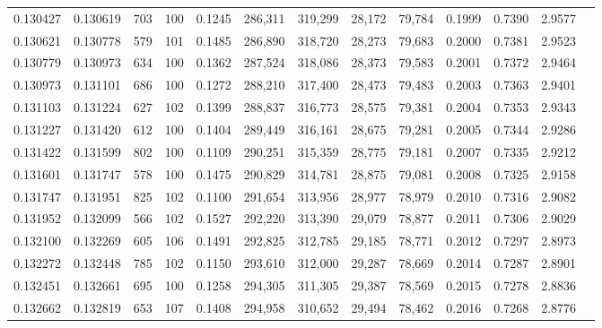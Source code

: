 \begin{tabular}{rrrrrrrrrrrrr}
0.130427 & 0.130619 &   703 & 100 &                                     0.1245 & 286,311 & 319,299 &  28,172 &  79,784 & 0.1999 & 0.7390 & 2.9577 \\
0.130621 & 0.130778 &   579 & 101 &                                     0.1485 & 286,890 & 318,720 &  28,273 &  79,683 & 0.2000 & 0.7381 & 2.9523 \\
0.130779 & 0.130973 &   634 & 100 &                                     0.1362 & 287,524 & 318,086 &  28,373 &  79,583 & 0.2001 & 0.7372 & 2.9464 \\
0.130973 & 0.131101 &   686 & 100 &                                     0.1272 & 288,210 & 317,400 &  28,473 &  79,483 & 0.2003 & 0.7363 & 2.9401 \\
0.131103 & 0.131224 &   627 & 102 &                                     0.1399 & 288,837 & 316,773 &  28,575 &  79,381 & 0.2004 & 0.7353 & 2.9343 \\
0.131227 & 0.131420 &   612 & 100 &                                     0.1404 & 289,449 & 316,161 &  28,675 &  79,281 & 0.2005 & 0.7344 & 2.9286 \\
0.131422 & 0.131599 &   802 & 100 &                                     0.1109 & 290,251 & 315,359 &  28,775 &  79,181 & 0.2007 & 0.7335 & 2.9212 \\
0.131601 & 0.131747 &   578 & 100 &                                     0.1475 & 290,829 & 314,781 &  28,875 &  79,081 & 0.2008 & 0.7325 & 2.9158 \\
0.131747 & 0.131951 &   825 & 102 &                                     0.1100 & 291,654 & 313,956 &  28,977 &  78,979 & 0.2010 & 0.7316 & 2.9082 \\
0.131952 & 0.132099 &   566 & 102 &                                     0.1527 & 292,220 & 313,390 &  29,079 &  78,877 & 0.2011 & 0.7306 & 2.9029 \\
0.132100 & 0.132269 &   605 & 106 &                                     0.1491 & 292,825 & 312,785 &  29,185 &  78,771 & 0.2012 & 0.7297 & 2.8973 \\
0.132272 & 0.132448 &   785 & 102 &                                     0.1150 & 293,610 & 312,000 &  29,287 &  78,669 & 0.2014 & 0.7287 & 2.8901 \\
0.132451 & 0.132661 &   695 & 100 &                                     0.1258 & 294,305 & 311,305 &  29,387 &  78,569 & 0.2015 & 0.7278 & 2.8836 \\
0.132662 & 0.132819 &   653 & 107 &                                     0.1408 & 294,958 & 310,652 &  29,494 &  78,462 & 0.2016 & 0.7268 & 2.8776 \\

\end{tabular}
